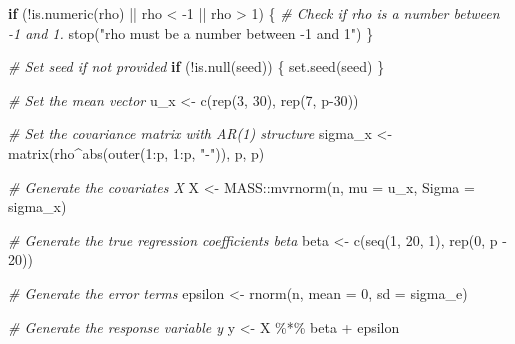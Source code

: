 \documentclass[
  11pt,
]{article}
\newenvironment{Shaded}{}{}
\newcommand{\AttributeTok}[1]{\textcolor[rgb]{0.49,0.56,0.16}{#1}}
\newcommand{\CommentTok}[1]{\textcolor[rgb]{0.38,0.63,0.69}{\textit{#1}}}
\newcommand{\ControlFlowTok}[1]{\textcolor[rgb]{0.00,0.44,0.13}{\textbf{#1}}}
\newcommand{\DecValTok}[1]{\textcolor[rgb]{0.25,0.63,0.44}{#1}}
\newcommand{\FunctionTok}[1]{\textcolor[rgb]{0.02,0.16,0.49}{#1}}
\newcommand{\NormalTok}[1]{#1}
\newcommand{\OtherTok}[1]{\textcolor[rgb]{0.00,0.44,0.13}{#1}}
\newcommand{\SpecialCharTok}[1]{\textcolor[rgb]{0.25,0.44,0.63}{#1}}
\newcommand{\StringTok}[1]{\textcolor[rgb]{0.25,0.44,0.63}{#1}}
\begin{document}
\begin{Shaded}
\begin{Highlighting}[]
  \ControlFlowTok{if}\NormalTok{ (}\SpecialCharTok{!}\FunctionTok{is.numeric}\NormalTok{(rho) }\SpecialCharTok{||}\NormalTok{ rho }\SpecialCharTok{\textless{}} \SpecialCharTok{{-}}\DecValTok{1} \SpecialCharTok{||}\NormalTok{ rho }\SpecialCharTok{\textgreater{}} \DecValTok{1}\NormalTok{) \{}
    \CommentTok{\# Check if rho is a number between {-}1 and 1.}
    \FunctionTok{stop}\NormalTok{(}\StringTok{"rho must be a number between {-}1 and 1"}\NormalTok{)}
\NormalTok{  \}}
  
  \CommentTok{\# Set seed if not provided}
  \ControlFlowTok{if}\NormalTok{ (}\SpecialCharTok{!}\FunctionTok{is.null}\NormalTok{(seed)) \{}
    \FunctionTok{set.seed}\NormalTok{(seed)}
\NormalTok{  \}}
  
  \CommentTok{\# Set the mean vector}
\NormalTok{  u\_x }\OtherTok{\textless{}{-}} \FunctionTok{c}\NormalTok{(}\FunctionTok{rep}\NormalTok{(}\DecValTok{3}\NormalTok{, }\DecValTok{30}\NormalTok{), }\FunctionTok{rep}\NormalTok{(}\DecValTok{7}\NormalTok{, p}\DecValTok{{-}30}\NormalTok{))}
  
  \CommentTok{\# Set the covariance matrix with AR(1) structure}
\NormalTok{  sigma\_x }\OtherTok{\textless{}{-}} \FunctionTok{matrix}\NormalTok{(rho}\SpecialCharTok{\^{}}\FunctionTok{abs}\NormalTok{(}\FunctionTok{outer}\NormalTok{(}\DecValTok{1}\SpecialCharTok{:}\NormalTok{p, }\DecValTok{1}\SpecialCharTok{:}\NormalTok{p, }\StringTok{"{-}"}\NormalTok{)), p, p)}
  
  \CommentTok{\# Generate the covariates X}
\NormalTok{  X }\OtherTok{\textless{}{-}}\NormalTok{ MASS}\SpecialCharTok{::}\FunctionTok{mvrnorm}\NormalTok{(n, }\AttributeTok{mu =}\NormalTok{ u\_x, }\AttributeTok{Sigma =}\NormalTok{ sigma\_x)}
  
  \CommentTok{\# Generate the true regression coefficients beta}
\NormalTok{  beta }\OtherTok{\textless{}{-}} \FunctionTok{c}\NormalTok{(}\FunctionTok{seq}\NormalTok{(}\DecValTok{1}\NormalTok{, }\DecValTok{20}\NormalTok{, }\DecValTok{1}\NormalTok{), }\FunctionTok{rep}\NormalTok{(}\DecValTok{0}\NormalTok{, p }\SpecialCharTok{{-}} \DecValTok{20}\NormalTok{))}
  
  \CommentTok{\# Generate the error terms}
\NormalTok{  epsilon }\OtherTok{\textless{}{-}} \FunctionTok{rnorm}\NormalTok{(n, }\AttributeTok{mean =} \DecValTok{0}\NormalTok{, }\AttributeTok{sd =}\NormalTok{ sigma\_e)}
  
  \CommentTok{\# Generate the response variable y}
\NormalTok{  y }\OtherTok{\textless{}{-}}\NormalTok{ X }\SpecialCharTok{\%*\%}\NormalTok{ beta }\SpecialCharTok{+}\NormalTok{ epsilon}
  

\end{Highlighting}
\end{Shaded}
\end{document}
